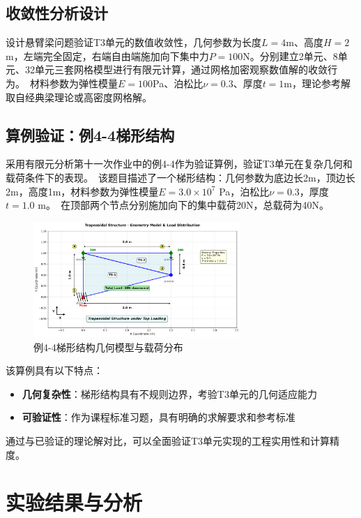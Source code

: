 \documentclass[12pt,a4paper]{article}
\begin{document}
\subsection{收敛性分析设计}

设计悬臂梁问题验证T3单元的数值收敛性，几何参数为长度$L = 4$m、高度$H = 2$m，左端完全固定，右端自由端施加向下集中力$P = 100$N。分别建立2单元、8单元、32单元三套网格模型进行有限元计算，通过网格加密观察数值解的收敛行为。\
材料参数为弹性模量$E = 100$Pa、泊松比$\nu = 0.3$、厚度$t = 1$m，理论参考解取自经典梁理论或高密度网格解。

\subsection{算例验证：例4-4梯形结构}

采用有限元分析第十一次作业中的例4-4作为验证算例，验证T3单元在复杂几何和载荷条件下的表现。\
该题目描述了一个梯形结构：几何参数为底边长2m，顶边长2m，高度1m，材料参数为弹性模量$E = 3.0 \times 10^7$ Pa，泊松比$\nu = 0.3$，厚度$t = 1.0$ m。\
在顶部两个节点分别施加向下的集中载荷20N，总载荷为40N。

\begin{figure}[H]
\centering
\includegraphics[width=0.7\textwidth]{img/wzy_geometry_model.png}
\caption{例4-4梯形结构几何模型与载荷分布}
\label{fig:wzy_model}
\end{figure}

该算例具有以下特点：
\begin{itemize}
    \item \textbf{几何复杂性}：梯形结构具有不规则边界，考验T3单元的几何适应能力
    \item \textbf{可验证性}：作为课程标准习题，具有明确的求解要求和参考标准
\end{itemize}

通过与已验证的理论解对比，可以全面验证T3单元实现的工程实用性和计算精度。

\section{实验结果与分析}
\end{document}

